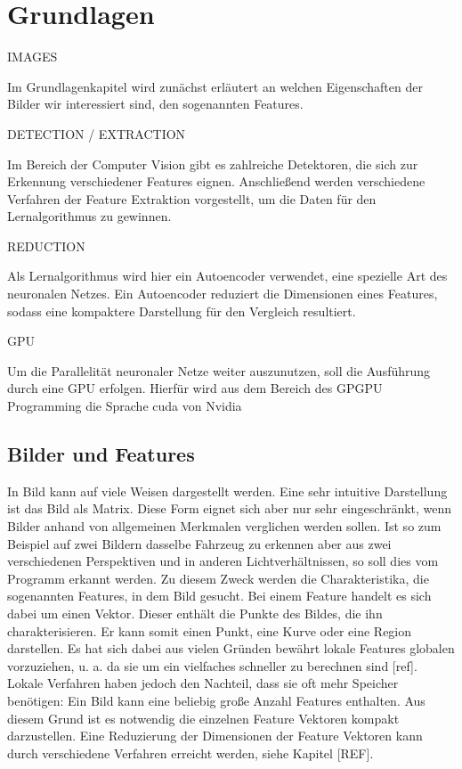 \chapter{Grundlagen}

IMAGES

Im Grundlagenkapitel wird zunächst erläutert an welchen Eigenschaften der Bilder wir interessiert sind, den sogenannten Features. 

DETECTION / EXTRACTION

Im Bereich der Computer Vision gibt es zahlreiche Detektoren, die sich zur Erkennung verschiedener Features eignen. Anschließend werden verschiedene Verfahren der Feature Extraktion vorgestellt, um die Daten für den Lernalgorithmus zu gewinnen. 

REDUCTION

Als Lernalgorithmus wird hier ein Autoencoder verwendet, eine spezielle Art des neuronalen Netzes. Ein Autoencoder reduziert die Dimensionen eines Features, sodass eine kompaktere Darstellung für den Vergleich resultiert.

GPU

Um die Parallelität neuronaler Netze weiter auszunutzen, soll die Ausführung durch eine GPU erfolgen. Hierfür wird aus dem Bereich des GPGPU Programming die Sprache cuda von Nvidia  


\section{Bilder und Features}

In Bild kann auf viele Weisen dargestellt werden. Eine sehr intuitive Darstellung ist das Bild als Matrix. Diese Form eignet sich aber nur sehr eingeschränkt, wenn Bilder anhand von allgemeinen Merkmalen verglichen werden sollen. Ist so zum Beispiel auf zwei Bildern dasselbe Fahrzeug zu erkennen aber aus zwei verschiedenen Perspektiven und in anderen Lichtverhältnissen, so soll dies vom Programm erkannt werden. Zu diesem Zweck werden die Charakteristika, die sogenannten Features, in dem Bild gesucht. Bei einem Feature handelt es sich dabei um einen Vektor. Dieser enthält die Punkte des Bildes, die ihn charakterisieren. Er kann somit einen Punkt, eine Kurve oder eine Region darstellen. Es hat sich dabei aus vielen Gründen bewährt lokale Features globalen vorzuziehen, u. a. da sie um ein vielfaches schneller zu berechnen sind [ref]. Lokale Verfahren haben jedoch den Nachteil, dass sie oft mehr Speicher benötigen: Ein Bild kann eine beliebig große Anzahl Features enthalten. Aus diesem Grund ist es notwendig die einzelnen Feature Vektoren kompakt darzustellen. Eine Reduzierung der Dimensionen der Feature Vektoren kann durch verschiedene Verfahren erreicht werden, siehe Kapitel [REF].

